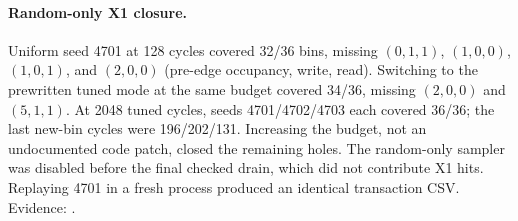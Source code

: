 \paragraph{Random-only X1 closure.} Uniform seed 4701 at 128 cycles covered
32/36 bins, missing $(0,1,1)$, $(1,0,0)$, $(1,0,1)$, and $(2,0,0)$
(pre-edge occupancy, write, read). Switching to the prewritten tuned mode
at the same budget covered 34/36, missing $(2,0,0)$ and $(5,1,1)$.
At 2048 tuned cycles, seeds 4701/4702/4703 each covered 36/36; the last
new-bin cycles were 196/202/131. Increasing the budget, not an undocumented
code patch, closed the remaining holes. The random-only sampler was disabled
before the final checked drain, which did not contribute X1 hits. Replaying
4701 in a fresh process produced an identical transaction CSV. Evidence:
.
